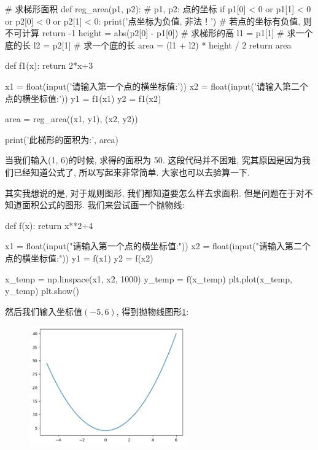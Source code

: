 \begin{python}
# 求梯形面积
def reg_area(p1, p2):
    # p1, p2: 点的坐标
    if p1[0] < 0 or p1[1] < 0 or p2[0] < 0 or p2[1] < 0:
        print('点坐标为负值, 非法！') # 若点的坐标有负值, 则不可计算
        return -1
    height = abs(p2[0] - p1[0]) # 求梯形的高
    l1 = p1[1] # 求一个底的长
    l2 = p2[1] # 求一个底的长
    area = (l1 + l2) * height / 2
    return area

def f1(x):
    return 2*x+3

x1 = float(input('请输入第一个点的横坐标值:'))
x2 = float(input('请输入第二个点的横坐标值:'))
y1 = f1(x1)
y2 = f1(x2)

area = reg_area((x1, y1), (x2, y2))

print('此梯形的面积为:', area)
\end{python}

当我们输入(1, 6)的时候, 求得的面积为 50. 这段代码并不困难, 究其原因是因为我们已经知道公式了, 所以写起来非常简单. 大家也可以去验算一下. 

其实我想说的是, 对于规则图形, 我们都知道要怎么样去求面积. 但是问题在于对不知道面积公式的图形. 我们来尝试画一个抛物线:

\begin{python}
def f(x):
    return x**2+4

x1 = float(input("请输入第一个点的横坐标值:"))
x2 = float(input("请输入第二个点的横坐标值:"))
y1 = f(x1)
y2 = f(x2)

x_temp = np.linspace(x1, x2, 1000)
y_temp = f(x_temp)
plt.plot(x_temp, y_temp)
plt.show()
\end{python}

然后我们输入坐标值$(-5,6)$, 得到抛物线图形\ref{fig:img13_9}:

\begin{figure}[ht]
  \centering
  \includegraphics[width=0.6\textwidth]{asset/20230903151121.png}
  \caption{}
  \label{fig:img13_9}
\end{figure}

